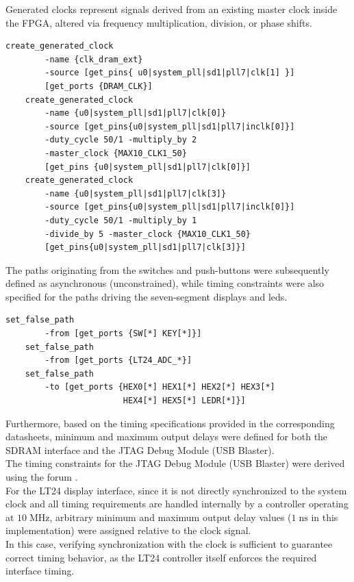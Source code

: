 \noindent
Generated clocks represent signals derived from an existing master clock inside the FPGA, altered via frequency multiplication, division, or phase shifts.

\vspace{1em}
\begin{lstlisting}[language=sdc, caption=Generated clock settings for timing analyzer]
    create_generated_clock 
        -name {clk_dram_ext} 
        -source [get_pins{ u0|system_pll|sd1|pll7|clk[1] }] 
        [get_ports {DRAM_CLK}] 
    create_generated_clock  
        -name {u0|system_pll|sd1|pll7|clk[0]} 
        -source [get_pins{u0|system_pll|sd1|pll7|inclk[0]}] 
        -duty_cycle 50/1 -multiply_by 2 
        -master_clock {MAX10_CLK1_50} 
        [get_pins {u0|system_pll|sd1|pll7|clk[0]}] 
    create_generated_clock  
        -name {u0|system_pll|sd1|pll7|clk[3]} 
        -source [get_pins{u0|system_pll|sd1|pll7|inclk[0]}] 
        -duty_cycle 50/1 -multiply_by 1 
        -divide_by 5 -master_clock {MAX10_CLK1_50} 
        [get_pins{u0|system_pll|sd1|pll7|clk[3]}] 
\end{lstlisting}

\noindent
The paths originating from the switches and push-buttons were subsequently defined as asynchronous (unconstrained), while timing constraints were also specified for the paths driving the seven-segment displays and leds.

\vspace{1em}
\begin{lstlisting}[language=sdc, caption=Paths constraints for asynchronous buttons and leds on the board]
    set_false_path 
        -from [get_ports {SW[*] KEY[*]}] 
    set_false_path 
        -from [get_ports {LT24_ADC_*}] 
    set_false_path 
        -to [get_ports {HEX0[*] HEX1[*] HEX2[*] HEX3[*]
                        HEX4[*] HEX5[*] LEDR[*]}]
\end{lstlisting}

\noindent
Furthermore, based on the timing specifications provided in the corresponding datasheets, minimum and maximum output delays were defined for both the SDRAM interface and the JTAG Debug Module (USB Blaster). \\
The timing constraints for the JTAG Debug Module (USB Blaster) were derived using the forum \cite{altera_jtag_constraints_2026}. \\
For the LT24 display interface, since it is not directly synchronized to the system clock and all timing requirements are handled internally by a controller operating at \(10 \; \text{MHz}\), arbitrary minimum and maximum output delay values (\(1 \; \text{ns}\) in this implementation) were assigned relative to the clock signal. \\
In this case, verifying synchronization with the clock is sufficient to guarantee correct timing behavior, as the LT24 controller itself enforces the required interface timing.

